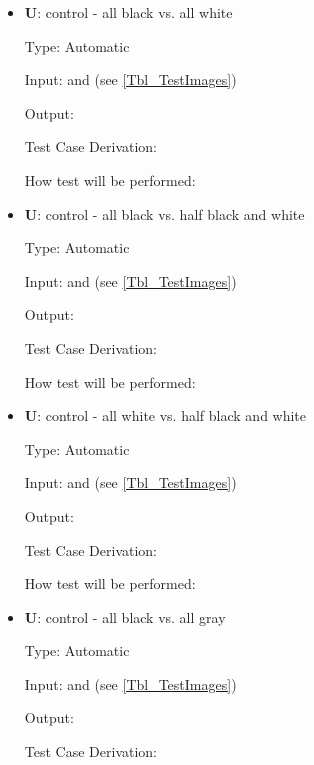 \documentclass[12pt, titlepage]{article}
\newcounter{testnum} %
\newcounter{unittestnum} %
\begin{document}
\begin{itemize}

\item{\textbf{U\theunittestnum \label{U_metric1}}: control - all black vs. all white}

Type: Automatic

Input:  and  (see \ref{Tbl_TestImages})

Output: 

Test Case Derivation: 

How test will be performed: 


\item{\textbf{U\theunittestnum \label{U_metric2}}: control - all black vs. half black and white}

Type: Automatic

Input:  and  (see \ref{Tbl_TestImages})

Output: 

Test Case Derivation: 

How test will be performed: 


\item{\textbf{U\theunittestnum \label{U_metric3}}: control - all white vs. half black and white}

Type: Automatic

Input:  and  (see \ref{Tbl_TestImages})

Output: 

Test Case Derivation: 

How test will be performed: 


\item{\textbf{U\theunittestnum \label{U_metric4}}: control - all black vs. all gray}

Type: Automatic

Input:  and  (see \ref{Tbl_TestImages})

Output: 

Test Case Derivation: 


\end{itemize}
\end{document}
